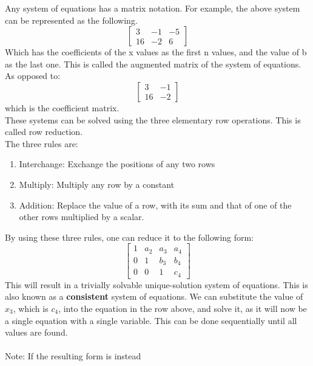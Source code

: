 \documentclass[nobib]{tufte-handout}
\begin{document}
Any system of equations has a matrix notation. For example, the above system can be represented as the following.\\
\begin{equation*}
    \begin{bmatrix}
        3  & -1 & -5 \\
        16 & -2 & 6
    \end{bmatrix}
\end{equation*}
Which has the coefficients of the x values as the first n values, and the value of b as the last one. This is called the augmented matrix of the system of equations. As opposed to:
\begin{equation*}
    \begin{bmatrix}
        3  & -1 \\
        16 & -2
    \end{bmatrix}
\end{equation*}
which is the coefficient matrix.\\
These systems can be solved using the three elementary row operations. This is called row reduction.\\
The three rules are:
\begin{enumerate}
    \item Interchange: Exchange the positions of any two rows
    \item Multiply: Multiply any row by a constant
    \item Addition: Replace the value of a row, with its sum and that of one of the other
          rows multiplied by a scalar.
\end{enumerate}
By using these three rules, one can reduce it to the following form:
\begin{equation*}
    \begin{bmatrix}
        1 & a_2 & a_3 & a_4 \\
        0 & 1   & b_3 & b_4 \\
        0 & 0   & 1   & c_4
    \end{bmatrix}
\end{equation*}
This will result in a trivially solvable unique-solution system of equations. This is also known as a \textbf{consistent} system of equations. We can substitute the value of $x_3$, which is $c_4$, into the equation in the row above, and solve it, as it will now be a single equation with a single variable. This can be done sequentially until all values are found.\\~\\
Note: If the resulting form is instead
\end{document}
